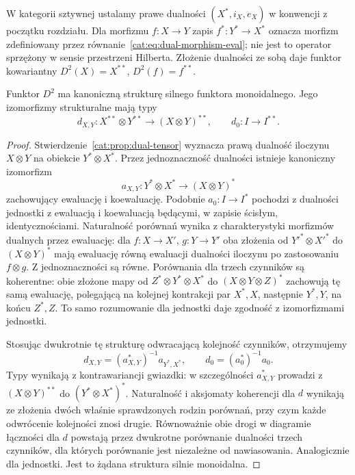W kategorii sztywnej ustalamy prawe dualności $(X^*,i_X,e_X)$ w konwencji z początku rozdziału. Dla morfizmu $f:X\to Y$ zapis $f^*:Y^*\to X^*$ oznacza morfizm zdefiniowany przez równanie~\eqref{cat:eq:dual-morphism-eval}; nie jest to operator sprzężony w sensie przestrzeni Hilberta. Złożenie dualności ze sobą daje funktor kowariantny $D^2(X)=X^{**}$, $D^2(f)=f^{**}$.

\begin{stwierdzenie}\label{cat:prop:tf-double-dual}
Funktor $D^2$ ma kanoniczną strukturę silnego funktora monoidalnego. Jego izomorfizmy strukturalne mają typy
\[
 d_{X,Y}:X^{**}\otimes Y^{**}\longrightarrow(X\otimes Y)^{**},
 \qquad d_0:I\longrightarrow I^{**}.
\]
\end{stwierdzenie}
\begin{proof}
Stwierdzenie~\ref{cat:prop:dual-tensor} wyznacza prawą dualność iloczynu $X\otimes Y$ na obiekcie $Y^*\otimes X^*$. Przez jednoznaczność dualności istnieje kanoniczny izomorfizm
\[
 a_{X,Y}:Y^*\otimes X^*\longrightarrow (X\otimes Y)^*
\]
zachowujący ewaluację i koewaluację. Podobnie $a_0:I\to I^*$ pochodzi z dualności jednostki z ewaluacją i koewaluacją będącymi, w zapisie ścisłym, identycznościami. Naturalność porównań wynika z charakterystyki morfizmów dualnych przez ewaluację: dla $f:X\to X'$, $g:Y\to Y'$ oba złożenia od $Y'^*\otimes X'^*$ do $(X\otimes Y)^*$ mają ewaluację równą ewaluacji dualności iloczynu po zastosowaniu $f\otimes g$. Z jednoznaczności są równe. Porównania dla trzech czynników są koherentne: obie złożone mapy od $Z^*\otimes Y^*\otimes X^*$ do $(X\otimes Y\otimes Z)^*$ zachowują tę samą ewaluację, polegającą na kolejnej kontrakcji par $X^*,X$, następnie $Y^*,Y$, na końcu $Z^*,Z$. To samo rozumowanie dla jednostki daje zgodność z izomorfizmami jednostki.

Stosując dwukrotnie tę strukturę odwracającą kolejność czynników, otrzymujemy
\[
 d_{X,Y}=(a_{X,Y}^*)^{-1}a_{Y^*,X^*},
 \qquad d_0=(a_0^*)^{-1}a_0 .
\]
Typy wynikają z kontrawariancji gwiazdki: w szczególności $a_{X,Y}^*$ prowadzi z $(X\otimes Y)^{**}$ do $(Y^*\otimes X^*)^*$. Naturalność i aksjomaty koherencji dla $d$ wynikają ze złożenia dwóch właśnie sprawdzonych rodzin porównań, przy czym każde odwrócenie kolejności znosi drugie. Równoważnie obie drogi w diagramie łączności dla $d$ powstają przez dwukrotne porównanie dualności trzech czynników, dla których porównanie jest niezależne od nawiasowania. Analogicznie dla jednostki. Jest to żądana struktura silnie monoidalna.
\end{proof}

